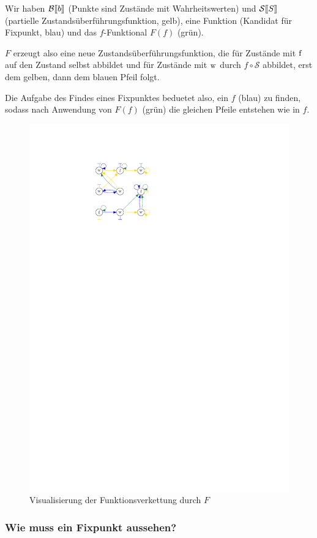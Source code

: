 Wir haben $\mathcal{B}\mathrm{[}\kern-.14em\mathrm{[} b\mathrm{]}\kern-.14em\mathrm{]}$ (Punkte sind Zustände mit Wahrheitswerten) und $\mathcal{S}\mathrm{[}\kern-.14em\mathrm{[} S\mathrm{]}\kern-.14em\mathrm{]}$ (partielle Zustandsüberführungsfunktion, gelb), eine Funktion (Kandidat für Fixpunkt, blau) und das $f$-Funktional $F(f)$ (grün).

$F$ erzeugt also eine neue Zustandsüberführungsfunktion, die für Zustände mit $\operatorname{f}$ auf den Zustand selbst abbildet und für Zustände mit $\operatorname{w}$ durch $f \circ \mathcal{S}$ abbildet, \dh{} erst dem gelben, dann dem blauen Pfeil folgt.

Die Aufgabe des Findes eines Fixpunktes beduetet also, ein $f$ (blau) zu finden, sodass nach Anwendung von $F(f)$ (grün) die gleichen Pfeile entstehen wie in $f$.
\begin{figure}[H]
    \centering
    \includegraphics[page=1,width=.4\textwidth]{img/f-combined}
    \caption{Visualisierung der Funktionsverkettung durch $F$}
\end{figure}



\subsubsection{Wie muss ein Fixpunkt aussehen?}

